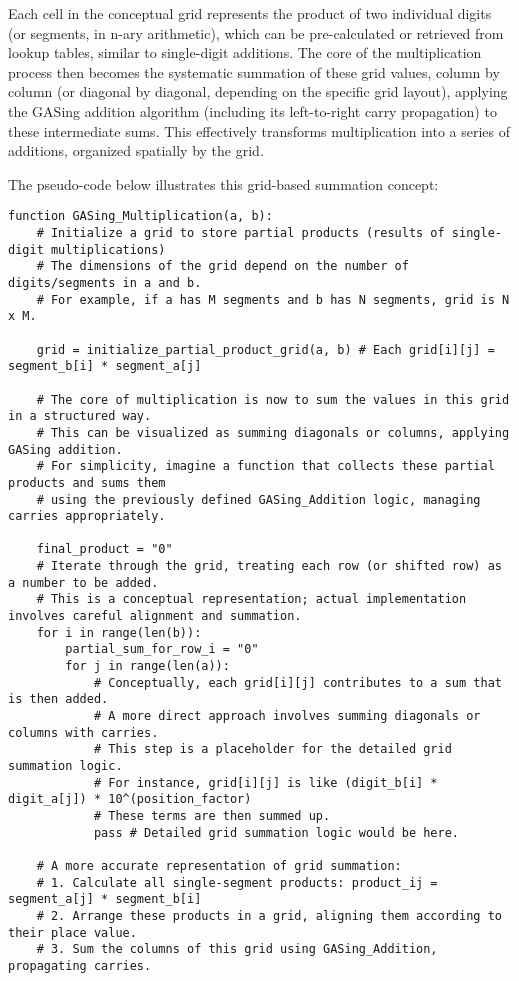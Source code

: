 Each cell in the conceptual grid represents the product of two individual digits (or segments, in n-ary arithmetic), which can be pre-calculated or retrieved from lookup tables, similar to single-digit additions. The core of the multiplication process then becomes the systematic summation of these grid values, column by column (or diagonal by diagonal, depending on the specific grid layout), applying the GASing addition algorithm (including its left-to-right carry propagation) to these intermediate sums. This effectively transforms multiplication into a series of additions, organized spatially by the grid.

The pseudo-code below illustrates this grid-based summation concept:



\begin{verbatim}
function GASing_Multiplication(a, b):
    # Initialize a grid to store partial products (results of single-digit multiplications)
    # The dimensions of the grid depend on the number of digits/segments in a and b.
    # For example, if a has M segments and b has N segments, grid is N x M.
        
    grid = initialize_partial_product_grid(a, b) # Each grid[i][j] = segment_b[i] * segment_a[j]
        
    # The core of multiplication is now to sum the values in this grid in a structured way.
    # This can be visualized as summing diagonals or columns, applying GASing addition.
    # For simplicity, imagine a function that collects these partial products and sums them
    # using the previously defined GASing_Addition logic, managing carries appropriately.

    final_product = "0"
    # Iterate through the grid, treating each row (or shifted row) as a number to be added.
    # This is a conceptual representation; actual implementation involves careful alignment and summation.
    for i in range(len(b)):
        partial_sum_for_row_i = "0"
        for j in range(len(a)):
            # Conceptually, each grid[i][j] contributes to a sum that is then added.
            # A more direct approach involves summing diagonals or columns with carries.
            # This step is a placeholder for the detailed grid summation logic.
            # For instance, grid[i][j] is like (digit_b[i] * digit_a[j]) * 10^(position_factor)
            # These terms are then summed up.
            pass # Detailed grid summation logic would be here.

    # A more accurate representation of grid summation:
    # 1. Calculate all single-segment products: product_ij = segment_a[j] * segment_b[i]
    # 2. Arrange these products in a grid, aligning them according to their place value.
    # 3. Sum the columns of this grid using GASing_Addition, propagating carries.


\end{verbatim}
